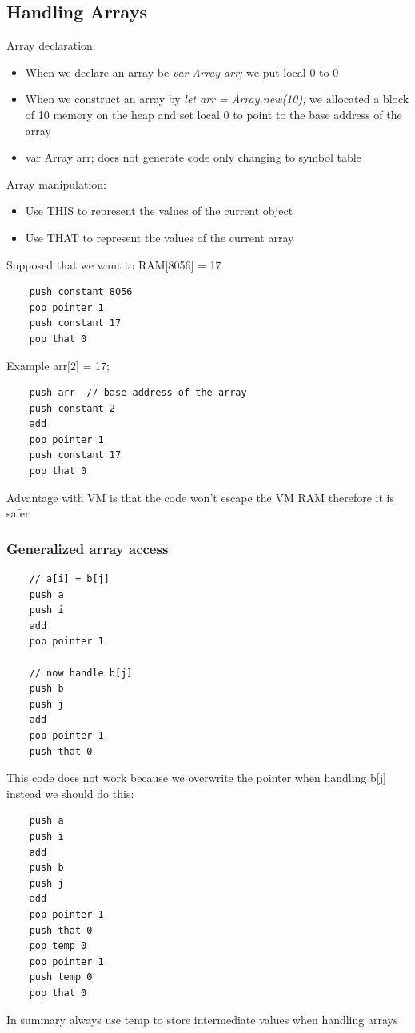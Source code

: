 \documentclass[12pt,a4paper]{article}
\begin{document}
\subsection{Handling Arrays}
Array declaration:
\begin{itemize}
    \item When we declare an array be \textit{var Array arr;} we put local 0 to 0
    \item When we construct an array by \textit{let arr = Array.new(10);} we allocated a block of 10 memory on the heap and set local 0 to point to the base address of the array
    \item var Array arr; does not generate code only changing to symbol table
\end{itemize}

Array manipulation:
\begin{itemize}
    \item Use THIS to represent the values of the current object
    \item Use THAT to represent the values of the current array
\end{itemize}

Supposed that we want to RAM[8056] = 17
\begin{verbatim}
    push constant 8056
    pop pointer 1 
    push constant 17
    pop that 0
\end{verbatim}

Example arr[2] = 17;
\begin{verbatim}
    push arr  // base address of the array
    push constant 2 
    add 
    pop pointer 1
    push constant 17
    pop that 0
\end{verbatim}
Advantage with VM is that the code won't escape the VM RAM therefore it is safer
  
\subsubsection{Generalized array access}
\begin{verbatim}
    // a[i] = b[j]
    push a 
    push i
    add 
    pop pointer 1

    // now handle b[j]
    push b
    push j
    add 
    pop pointer 1 
    push that 0
\end{verbatim}
This code does not work because we overwrite the pointer when handling b[j] instead we should do this:
\begin{verbatim}
    push a 
    push i 
    add
    push b
    push j 
    add
    pop pointer 1
    push that 0 
    pop temp 0  
    pop pointer 1
    push temp 0
    pop that 0 
\end{verbatim}
In summary always use temp to store intermediate values when handling arrays
\end{document}
